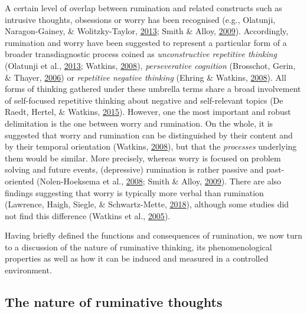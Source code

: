 \documentclass[a4paper,12pt,twoside,openright,oldfontcommands]{memoir}
\begin{document}
A certain level of overlap between rumination and related constructs such as intrusive thoughts, obsessions or worry has been recognised (e.g., Olatunji, Naragon-Gainey, \& Wolitzky-Taylor, \protect\hyperlink{ref-olatunji_specificity_2013}{2013}; Smith \& Alloy, \protect\hyperlink{ref-Smith2009}{2009}). Accordingly, rumination and worry have been suggested to represent a particular form of a broader transdiagnostic process coined as \emph{unconstructive repetitive thinking} (Olatunji et al., \protect\hyperlink{ref-olatunji_specificity_2013}{2013}; Watkins, \protect\hyperlink{ref-Watkins2008}{2008}), \emph{perseverative cognition} (Brosschot, Gerin, \& Thayer, \protect\hyperlink{ref-Brosschot2006}{2006}) or \emph{repetitive negative thinking} (Ehring \& Watkins, \protect\hyperlink{ref-ehring_repetitive_2008}{2008}). All forms of thinking gathered under these umbrella terms share a broad involvement of self-focused repetitive thinking about negative and self-relevant topics (De Raedt, Hertel, \& Watkins, \protect\hyperlink{ref-de_raedt_mechanisms_2015}{2015}). However, one the most important and robust delimitation is the one between worry and rumination. On the whole, it is suggested that worry and rumination can be distinguished by their content and by their temporal orientation (Watkins, \protect\hyperlink{ref-Watkins2008}{2008}), but that the \emph{processes} underlying them would be similar. More precisely, whereas worry is focused on problem solving and future events, (depressive) rumination is rather passive and past-oriented (Nolen-Hoeksema et al., \protect\hyperlink{ref-Nolen-Hoeksema2008}{2008}; Smith \& Alloy, \protect\hyperlink{ref-Smith2009}{2009}). There are also findings suggesting that worry is typically more verbal than rumination (Lawrence, Haigh, Siegle, \& Schwartz-Mette, \protect\hyperlink{ref-lawrence_visual_2018}{2018}), although some studies did not find this difference (Watkins et al., \protect\hyperlink{ref-watkins_comparisons_2005}{2005}).

Having briefly defined the functions and consequences of rumination, we now turn to a discussion of the nature of ruminative thinking, its phenomenological properties as well as how it can be induced and measured in a controlled environment.

\hypertarget{the-nature-of-ruminative-thoughts}{%
\subsection{The nature of ruminative thoughts}\label{the-nature-of-ruminative-thoughts}}
\end{document}
